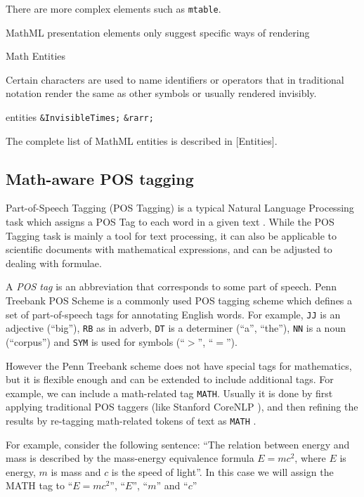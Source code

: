 There are more complex elements such as \texttt{mtable}.

MathML presentation elements only suggest specific ways of rendering

Math Entities

Certain characters are used to name identifiers or operators that in
traditional notation render the same as other symbols or usually
rendered invisibly.

entities \texttt{\&InvisibleTimes;} \texttt{\&rarr;}

The complete list of MathML entities is described in [Entities].




\subsection{Math-aware POS tagging} \label{sec:postagging}
Part-of-Speech Tagging (POS Tagging) is a typical Natural Language Processing 
task which assigns a POS Tag to each word in a given text \cite{jurafsky2000speech}. 
While the POS Tagging task is mainly a tool for text processing, it can 
also be applicable to scientific documents with mathematical expressions, 
and can be adjusted to dealing with formulae. 

A \emph{POS tag} is an abbreviation that corresponds to some
part of speech. Penn Treebank POS Scheme \cite{santorini1990part} is 
a commonly used POS tagging scheme which defines a set of part-of-speech tags 
for annotating English words.
For example, \texttt{JJ} is an adjective (``big''), \texttt{RB} as in adverb, 
\texttt{DT} is a determiner (``a'', ``the''), \texttt{NN} is a 
noun (``corpus'') and \texttt{SYM} is used for symbols (``$>$'', ``$=$''). 


However the Penn Treebank scheme does not have special tags for mathematics,
but it is flexible enough and can be extended to include additional tags.
For example, we can include a math-related tag \texttt{MATH}.
Usually it is done by first applying traditional POS taggers (like Stanford
CoreNLP \cite{manning2014stanford}), and then 
refining the results by re-tagging math-related tokens of text as \texttt{MATH}
\cite{schoneberg2014pos}.


For example, consider the following sentence:
``The relation between energy and mass is
described by  the mass-energy equivalence formula $E = mc^2$,
where $E$ is energy, $m$ is mass and $c$ is the speed of light''.
In this case we will assign the MATH tag to ``$E = mc^2$'', ``$E$'',
``$m$'' and ``$c$''

